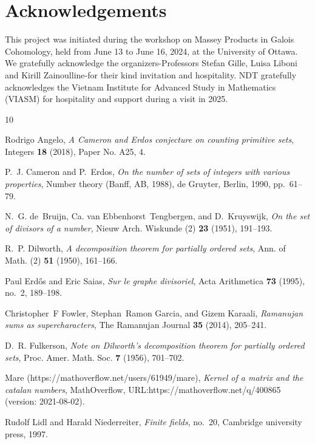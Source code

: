 \documentclass[11pt,a4paper]{amsart}
\theoremstyle{definition}
\numberwithin{equation}{section}
\begin{document}
\section*{Acknowledgements}
This project was initiated during the workshop on Massey Products in Galois Cohomology, held from June 13 to June 16, 2024, at the University of Ottawa. We gratefully acknowledge the organizers-Professors Stefan Gille, Luisa Liboni and Kirill Zainoulline-for their kind invitation and hospitality. NDT gratefully acknowledges the Vietnam Institute for Advanced Study in Mathematics (VIASM) for hospitality and support during a visit in 2025.

\begin{thebibliography}{10}

Rodrigo Angelo, \emph{A {C}ameron and {E}rdos conjecture on counting primitive sets}, Integers \textbf{18} (2018), Paper No. A25, 4. 

P.~J. Cameron and P.~Erdos, \emph{On the number of sets of integers with various properties}, Number theory ({B}anff, {AB}, 1988), de Gruyter, Berlin, 1990, pp.~61--79. 

N.~G. de~Bruijn, Ca. van Ebbenhorst~Tengbergen, and D.~Kruyswijk, \emph{On the set of divisors of a number}, Nieuw Arch. Wiskunde (2) \textbf{23} (1951), 191--193. 

R.~P. Dilworth, \emph{A decomposition theorem for partially ordered sets}, Ann. of Math. (2) \textbf{51} (1950), 161--166. 

Paul Erd{\H{o}}s and Eric Saias, \emph{Sur le graphe divisoriel}, Acta Arithmetica \textbf{73} (1995), no.~2, 189--198.

Christopher~F Fowler, Stephan~Ramon Garcia, and Gizem Karaali, \emph{Ramanujan sums as supercharacters}, The Ramanujan Journal \textbf{35} (2014), 205--241.

D.~R. Fulkerson, \emph{Note on {D}ilworth's decomposition theorem for partially ordered sets}, Proc. Amer. Math. Soc. \textbf{7} (1956), 701--702. 

Mare (https://mathoverflow.net/users/61949/mare), \emph{Kernel of a matrix and the catalan numbers}, MathOverflow, URL:https://mathoverflow.net/q/400865 (version: 2021-08-02).

Rudolf Lidl and Harald Niederreiter, \emph{Finite fields}, no.~20, Cambridge university press, 1997.


\end{thebibliography}
\end{document}
